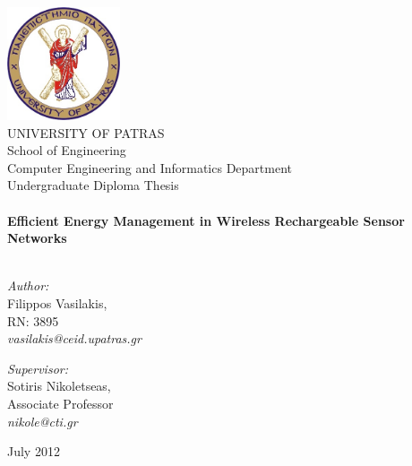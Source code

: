 \begin{titlingpage}
\begin{center}

\includegraphics[width=0.25\textwidth]{images/upatras_logo.jpg}\\[1cm]

\HUGE 	UNIVERSITY OF PATRAS\\
\LARGE	School of Engineering\\
\Huge	Computer Engineering and Informatics Department\\[1.5cm]

\LARGE Undergraduate Diploma Thesis\\[0.1cm]


\HRule \\[0.4cm]
{ \HUGE \bfseries Efficient Energy Management in Wireless Rechargeable Sensor Networks}\\[0.4cm]

\HRule \\[0.5cm]

\begin{minipage}{0.4\textwidth}
\begin{flushleft} \large
\textit{Author:}\\
Filippos Vasilakis, \\RN: 3895\\ \textit{vasilakis@ceid.upatras.gr}
\end{flushleft}
\end{minipage}
\begin{minipage}{0.4\textwidth}
\begin{flushright} \large
\textit{Supervisor:} \\
Sotiris Nikoletseas, \\Associate Professor\\ \textit{nikole@cti.gr}
\end{flushright}
\end{minipage}

\vfill

{\large July 2012}

\end{center}

\end{titlingpage}

